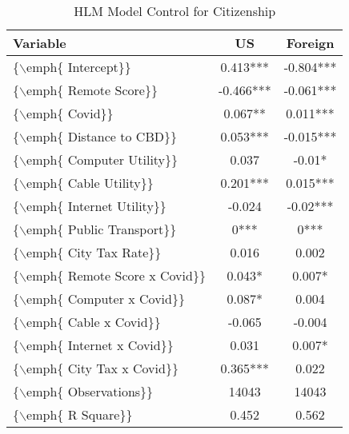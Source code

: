 \begin{table}[ht]
\centering
\begin{tabular}{|l|c|c|}
  \hline
Variable & US & Foreign \\ 
  \hline
\{$\backslash$emph\{ Intercept\}\} & 0.413*** & -0.804*** \\ 
  \{$\backslash$emph\{ Remote Score\}\} & -0.466*** & -0.061*** \\ 
  \{$\backslash$emph\{ Covid\}\} & 0.067** & 0.011*** \\ 
  \{$\backslash$emph\{ Distance to CBD\}\} & 0.053*** & -0.015*** \\ 
  \{$\backslash$emph\{ Computer Utility\}\} & 0.037 & -0.01* \\ 
  \{$\backslash$emph\{ Cable Utility\}\} & 0.201*** & 0.015*** \\ 
  \{$\backslash$emph\{ Internet Utility\}\} & -0.024 & -0.02*** \\ 
  \{$\backslash$emph\{ Public Transport\}\} & 0*** & 0*** \\ 
  \{$\backslash$emph\{ City Tax Rate\}\} & 0.016 & 0.002 \\ 
  \{$\backslash$emph\{ Remote Score x Covid\}\} & 0.043* & 0.007* \\ 
  \{$\backslash$emph\{ Computer x Covid\}\} & 0.087* & 0.004 \\ 
  \{$\backslash$emph\{ Cable x Covid\}\} & -0.065 & -0.004 \\ 
   \hline\hline
\{$\backslash$emph\{ Internet x Covid\}\} & 0.031 & 0.007* \\ 
  \{$\backslash$emph\{ City Tax x Covid\}\} & 0.365*** & 0.022 \\ 
  \{$\backslash$emph\{ Observations\}\} & 14043 & 14043 \\ 
  \{$\backslash$emph\{ R Square\}\} & 0.452 & 0.562 \\ 
   \hline
\end{tabular}
\caption{HLM Model Control for Citizenship} 
\end{table}
